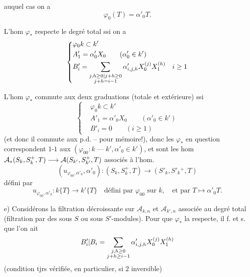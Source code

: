 auquel cas on a
\[
 \varphi_0(T)=\alpha'_0T.
\]

L'hom $\varphi_*$ respecte le degré total ssi on a
\[
 \left\{\begin{aligned}
 &\varphi_0 k\subset k'\\
 &A'_1=\alpha'_0X_0\qquad(\alpha'_0\in k')\\
 &B'_i=\sum_{\substack{{j,h\geq0|j+h\geq0}\\j+h=i-1}}
 \alpha'_{i,j,h}X_0^{(j)}X_1^{(h)}\quad i\geq1
 \end{aligned}\right.
\]

L'hom $\varphi_*$ commute aux deux graduations (totale et extérieure) ssi
\[
 \left\{\begin{aligned}
 &\varphi_0 k\subset k'\\
 &A'_1=\alpha'_0X_0\qquad(\alpha'_0\in k')\\
 &B'_i=0\qquad(i\geq1)
 \end{aligned}\right.
\]
(et donc il commute aux p.d. -- pour mémoire!),
donc les $\varphi_*$ en question correspondent $1$-$1$ aux
$(\varphi_{00}:k\mathbin{\text{---}}k',\alpha'_0\in k')$, et
sont les hom 
$\mathcal A_{{*}}(S_k,S_k^+,T)\longrightarrow\mathcal A(S_{k'},S_{k'}^+,T)$
associés à l'hom.
\[
 (u_{\varphi_{00},\alpha'_0},\alpha'_0):(S_k,S_k^+,T)
 \longrightarrow(S'_k,S'_k{}^+,T)
\]
défini par
\[
 u_{\varphi_{00},\alpha'_0}:k\{T\}\longrightarrow k'\{T\}
 \quad\text{défini par }\varphi_{00}\text{ sur }k,\quad
 \text{et par }T\longmapsto\alpha'_0T.
\]

e) Considérons la filtration décroissante sur
$\mathcal A_{k,n}$ et $\mathcal A_{k',n}$ associée au degré total
(filtration par des sous $S$ ou sous $S'$-modules).
Pour que $\varphi_*$ la respecte, il f. et s. que l'on ait
\[
 {B'_i|B_i}=\sum_{\substack{j,h\geq0\\j+h\geq i-1}}
 \alpha'_{i,j,h}X_0^{(j)}X_1^{(h)}
\]
(condition tjrs vérifiée, en particulier, si $2$ inversible)
